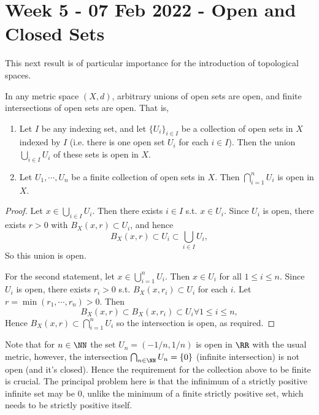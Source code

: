 \section{Week 5 - 07 Feb 2022 - Open and Closed Sets}
This next result is of particular importance for the introduction of topological
spaces.
\begin{proposition}
  In any metric space $(X,d)$, arbitrary unions of open sets are open, and
  finite intersections of open sets are open. That is,
  \begin{enumerate}
    \item Let $I$ be any indexing set, and let $\{U_i\}_{i\in I}$ be a
      collection of open sets in $X$ indexed by $I$ (i.e. there is one open set
    $U_i$ for each $i\in I$). Then the union $\bigcup_{i\in I} U_i$ of these
    sets is open in $X$.
  \item Let $U_1,\cdots, U_n$ be a finite collection of open sets in $X$. Then
    $\bigcap_{i=1}^n U_i$ is open in $X$.
  \end{enumerate}

  \label{prop:openSetsUnionIntersections}
\end{proposition}
\begin{proof}
  Let $x\in \bigcup_{i\in I} U_i$. Then there exists $i\in I$ s.t. $x\in U_i$.
  Since $U_i$ is open, there exists $r>0$ with $B_X(x,r)\subset U_i$, and hence 
  \[B_X(x,r)\subset U_i \subset \bigcup_{i\in I} U_i,\]
  So this union is open.

  For the second statement, let $x\in \bigcup_{i=1}^n U_i$. Then $x\in U_i$ for
  all $1\leq i\leq n$. Since $U_i$ is open, there exists $r_i>0$ s.t.
  $B_X(x,r_i)\subset U_i$ for each $i$. Let $r=\min(r_1,\cdots, r_n)>0$. Then 
  \[B_X(x,r)\subset B_X(x,r_i)\subset U_i \forall 1\leq i\leq n,\]
  Hence $B_X(x,r)\subset \bigcap_{i=1}^n U_i$ so the intersection is open, as
  required.
\end{proof}
\begin{remark}
  Note that for $n\in\NN$ the set $U_n=(-1/n,1/n)$ is open in $\RR$ with the
  usual metric, however, the intersection $\bigcap_{n\in\NN} U_n =\{0\}$
  (infinite intersection) is not open (and it's closed). Hence the requirement
  for the collection above to be finite is crucial. The principal problem here
  is that the infinimum of a strictly positive infinite set may be 0, unlike the
  minimum of a finite strictly positive set, which needs to be strictly positive
  itself.
\end{remark}

